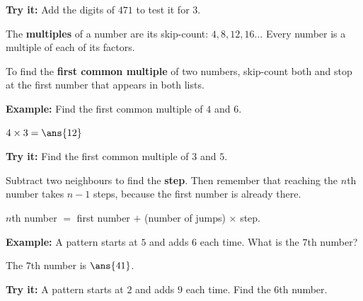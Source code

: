\documentclass[12pt]{article}
\begin{document}
\begin{tryitbox}
\textbf{Try it:} \quad Add the digits of $471$ to test it for $3$.\\[2pt]
\end{tryitbox}


\begin{formulabox}
The \textbf{multiples} of a number are its skip-count: $4, 8, 12, 16 \ldots$
Every number is a multiple of each of its factors.\par
To find the \textbf{first common multiple} of two numbers, skip-count both and
stop at the first number that appears in both lists.
\end{formulabox}

\begin{examplebox}
\textbf{Example:} \quad Find the first common multiple of $4$ and $6$.

$4 \times 3 = \ans{12}$
\end{examplebox}

\begin{tryitbox}
\textbf{Try it:} \quad Find the first common multiple of $3$ and $5$.\\[2pt]
\end{tryitbox}


\begin{formulabox}
Subtract two neighbours to find the \textbf{step}. Then remember that reaching
the $n$th number takes $n - 1$ steps, because the first number is already
there.\par
$n$th number $=$ first number $+$ (number of jumps) $\times$ step.
\end{formulabox}

\begin{examplebox}
\textbf{Example:} \quad A pattern starts at $5$ and adds $6$ each time. What is
the $7$th number?

The $7$th number is $\ans{41}$.
\end{examplebox}

\begin{tryitbox}
\textbf{Try it:} \quad A pattern starts at $2$ and adds $9$ each time. Find the
$6$th number.\\[2pt]
\end{tryitbox}
\end{document}
